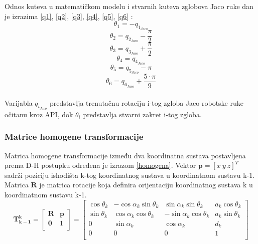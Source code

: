 \documentclass[times, utf8, diplomski, numeric]{fer}
\begin{document}
Odnos kuteva u matematičkom modelu i stvarnih kuteva zglobova Jaco ruke dan je izrazima \ref{q1}, \ref{q2}, \ref{q3}, \ref{q4}, \ref{q5}, \ref{q6} :
 \begin{equation}
\theta_{1}=-q_{1_{Jaco}}
\label{q1}
\end{equation}
\begin{equation}
\theta_{2}=q_{2_{Jaco}}-\frac{\pi}{2}
\label{q2}
\end{equation}
\begin{equation}
\theta_{3}=q_{3_{Jaco}}+\frac{\pi}{2}
\label{q3}
\end{equation}
\begin{equation}
\theta_{4}=q_{4_{Jaco}}
\label{q4}
\end{equation}
\begin{equation}
\theta_{5}=q_{5_{Jaco}}-\pi
\label{q5}
\end{equation}
\begin{equation}
\theta_{6}=q_{6_{Jaco}}+\dfrac{5\cdot \pi}{9}
\label{q6}
\end{equation}\\

Varijabla $q_{i_{Jaco}}$ predstavlja trenutačnu rotaciju i-tog zgloba Jaco robotske ruke očitanu kroz API, dok $\theta_i$ predstavlja stvarni zakret i-tog zgloba.

\subsubsection{Matrice homogene transformacije}
Matrica homogene transformacije između dva koordinatna sustava postavljena prema D-H postupku određena je izrazom \ref{homogena}.
Vektor $\mathbf{p} = [x\ y\ z]^T$ sadrži poziciju ishodišta k-tog koordinatnog sustava u koordinatnom sustavu k-1.
Matrica $\mathbf{R}$ je matrica rotacije koja definira orijentaciju koordinatnog sustava k u koordinatnom sustavu k-1.
\begin{equation}
\mathbf{T_{k-1}^k} =
\begin{bmatrix} 
\mathbf{R} & \mathbf{p}\\ 
\mathbf{0} & 1\\
\end{bmatrix}
=
\begin{bmatrix} 
\cos\theta_{k}& -\cos\alpha_{k}\sin\theta_{k} & \sin\alpha_{k}\sin\theta_{k} & a_k\cos\theta_{k}\\ 
\sin\theta_{k}& \cos\alpha_{k}\cos\theta_{k} & -\sin\alpha_{k}\cos\theta_{k} & a_k\sin\theta_{k}\\
0 & \sin\alpha_{k} & \cos\alpha_{k} & d_{k}\\
0 & 0 & 0 & 1\\
\end{bmatrix}
\label{homogena}
\end{equation}
\end{document}
